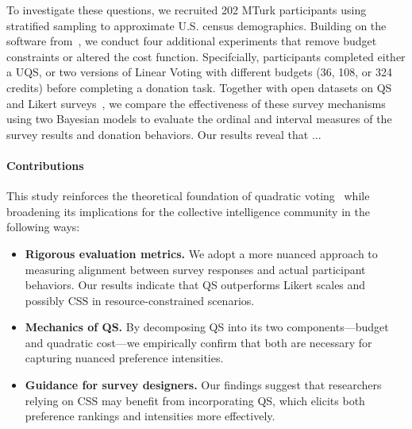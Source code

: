 
To investigate these questions, we recruited 202 MTurk participants using stratified sampling to approximate U.S. census demographics. Building on the software from~\citet{chengCanShowWhat2021}, we conduct four additional experiments that remove budget constraints or altered the cost function. Specifcially, participants completed either a UQS, or two versions of Linear Voting with different budgets (36, 108, or 324 credits) before completing a donation task. Together with open datasets on QS and Likert surveys~\cite{illinoisdatabankIDB-1928463}, we compare the effectiveness of these survey mechanisms using two Bayesian models to evaluate the ordinal and interval measures of the survey results and donation behaviors. Our results reveal that ...


\paragraph{Contributions}
This study reinforces the theoretical foundation of quadratic voting~\cite{lalley2016quadratic} while broadening its implications for the collective intelligence community in the following ways:
\begin{itemize}
    \item \textbf{Rigorous evaluation metrics.} We adopt a more nuanced approach to measuring alignment between survey responses and actual participant behaviors. Our results indicate that QS outperforms Likert scales and possibly CSS in resource-constrained scenarios.
    \item \textbf{Mechanics of QS.} By decomposing QS into its two components---budget and quadratic cost---we empirically confirm that both are necessary for capturing nuanced preference intensities.
    \item \textbf{Guidance for survey designers.} Our findings suggest that researchers relying on CSS may benefit from incorporating QS, which elicits both preference rankings and intensities more effectively.
\end{itemize}



